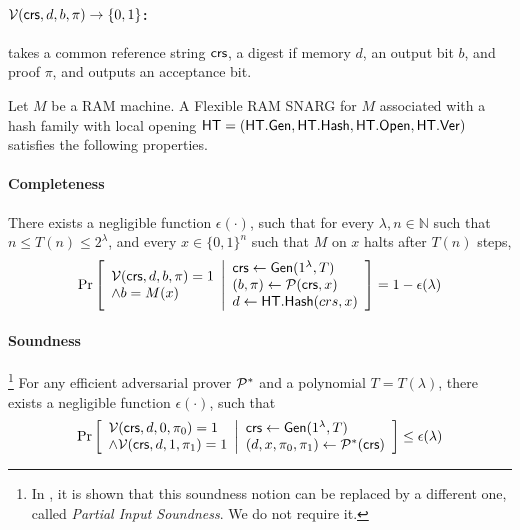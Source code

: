\paragraph{$\Ver(\var{\crs}, %
d, b, \pi)\to \set{0,1}$:} takes a common reference string $\mathit{ \mathsf{crs} }$, %
a digest if memory $d$, an output bit $b$, and proof $\pi$,
and outputs an acceptance bit.


\begin{definition}
Let $M$ be a RAM machine. A Flexible RAM SNARG for $M$ associated with a hash family with local opening
$\mathsf{HT} = (\mathsf{HT}.\mathsf{Gen}, \mathsf{HT}.\mathsf{Hash}, \mathsf{HT}.\mathsf{Open}, \mathsf{HT}.\mathsf{Ver})$ satisfies the following properties.
\paragraph{Completeness} 
There exists a negligible function $\epsilon(\cdot)$, such that for every $\lambda, n\in \mathbb{N}$ such that $n\leq T(n) \leq 2^\lambda$, and every $x\in \{0,1\}^n$ such that $M$ on $x$ halts after $T(n)$ steps,
\begin{gather*}
    \underset{}{\text{Pr}}\left [
    \begin{array}{ll}
    \mathcal{V}(\mathsf{crs}, d, b, \pi) = 1 \\
    \wedge b = M(x)
    \end{array}
    \middle\vert
    \begin{array}{ll}
    \mathit{ \mathsf{crs} } \leftarrow \mathsf{Gen}(1^\lambda, T) \\
    (b, \pi) \leftarrow \mathcal{P}(\mathsf{crs}, x) \\
    d \leftarrow \mathsf{HT}.\mathsf{Hash}(crs, x)
    \end{array}
    \right ] = 1 - \epsilon(\lambda)
\end{gather*}

\paragraph{Soundness}\footnote{
In \cite{cryptoeprint:2022/1320}, it is shown that this soundness notion can be replaced by a different one, called \emph{Partial Input Soundness}. We do not require it.
}
For any efficient adversarial prover $\mathcal{P}^*$ and a polynomial $T = T(\lambda)$, there exists a negligible function $\epsilon(\cdot)$, such that
\begin{gather*}
    \underset{}{\text{Pr}}\left [
    \begin{array}{ll}
    \mathcal{V}(\mathit{ \mathsf{crs} }, d, 0, \pi_0) = 1 \\
    \wedge \mathcal{V}(\mathsf{crs}, d, 1, \pi_1) = 1
    \end{array}
    \middle\vert
    \begin{array}{ll}
    \mathit{ \mathsf{crs} } \leftarrow \mathsf{Gen}(1^\lambda, T) \\
    (d, x, \pi_0, \pi_1) \leftarrow \mathcal{P}^*(\mathit{ \mathsf{crs} }) \\
    \end{array}
    \right ] \leq \epsilon(\lambda)
\end{gather*}

\end{definition}
